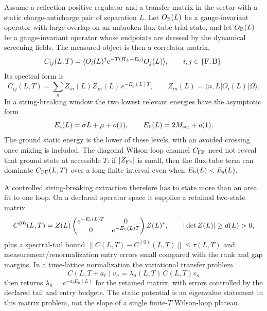 \begin{controlledapproximation}
\label{ca:wilson-loop-string-breaking-spectral-extraction-test}
Assume a reflection-positive regulator and a transfer matrix in the sector
with a static charge-anticharge pair of separation \(L\).  Let
\(O_{\rm F}(L)\) be a gauge-invariant operator with large overlap on an
unbroken flux-tube trial state, and let \(O_{\rm B}(L)\) be a gauge-invariant
operator whose endpoints are dressed by the dynamical screening fields.  The
measured object is then a correlator matrix,
\begin{equation}
  C_{ij}(L,T)
  =
  \langle O_i(L)^\dagger e^{-T(H_L-E_0)}O_j(L)\rangle,
  \qquad i,j\in\{{\rm F},{\rm B}\}.
  \label{eq:string-breaking-correlator-matrix}
\end{equation}
Its spectral form is
\begin{equation}
  C_{ij}(L,T)
  =
  \sum_n Z_{in}(L)\overline{Z_{jn}(L)}\,e^{-E_n(L)T},
  \qquad
  Z_{in}(L)=\langle n,L|O_i(L)|\Omega\rangle .
  \label{eq:string-breaking-spectral-matrix}
\end{equation}
In a string-breaking window the two lowest relevant energies have the
asymptotic form
\[
  E_{\rm s}(L)=\sigma L+\mu+o(1),
  \qquad
  E_{\rm b}(L)=2M_{\rm scr}+o(1).
\]
The ground static energy is the lower of these levels, with an avoided crossing
once mixing is included.  The diagonal Wilson-loop channel \(C_{{\rm F}{\rm F}}\)
need not reveal that ground state at accessible \(T\): if
\(|Z_{{\rm F}{\rm b}}|\) is small, then the flux-tube term can dominate
\(C_{{\rm F}{\rm F}}(L,T)\) over a long finite interval even when
\(E_{\rm b}(L)<E_{\rm s}(L)\).

A controlled string-breaking extraction therefore has to state more than an
area fit to one loop.  On a declared operator space it supplies a retained
two-state matrix
\begin{equation}
  C^{(0)}(L,T)
  =
  Z(L)
  \begin{pmatrix}
    e^{-E_{\rm s}(L)T} & 0\\
    0 & e^{-E_{\rm b}(L)T}
  \end{pmatrix}
  Z(L)^* ,
  \qquad |\det Z(L)|\ge d(L)>0,
  \label{eq:string-breaking-retained-two-state-matrix}
\end{equation}
plus a spectral-tail bound
\(\|C(L,T)-C^{(0)}(L,T)\|\le \tau(L,T)\) and measurement/renormalization
entry errors small compared with the rank and gap margins.  In a time-lattice
normalization the variational transfer problem
\begin{equation}
  C(L,T+a_t)v_n
  =
  \lambda_n(L,T)\,C(L,T)v_n
  \label{eq:string-breaking-gevp}
\end{equation}
then returns \(\lambda_n=e^{-a_tE_n(L)}\) for the retained matrix, with errors
controlled by the declared tail and entry budgets.  The static potential is an
eigenvalue statement in this matrix problem, not the slope of a single
finite-\(T\) Wilson-loop plateau.


\end{controlledapproximation}
